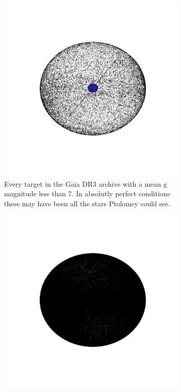 \begin{figure}[htbp]
\begin{subfigure}[t]{0.3\textwidth}
      \includegraphics[width=\textwidth]{figures/introduction/ModernStarsGaiaL7.png}
      \caption{Every target in the Gaia DR3 archive with a mean g magnitude
      less than 7. In absolutly perfect conditions these may have been all the
      stars Ptolomey could see.}
      \label{fig:starsL7}
  \end{subfigure}
  \begin{subfigure}[t]{0.3\textwidth}
      \centering
      \includegraphics[width=\textwidth]{figures/introduction/ModernStarsGaiaL10.png}

\end{subfigure}
\end{figure}
